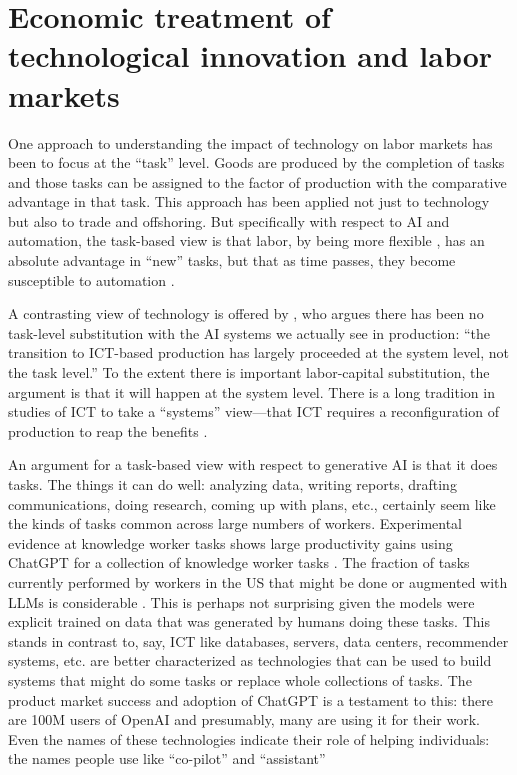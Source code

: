 \documentclass{article}
\begin{document}
\section{Economic treatment of technological innovation and labor markets}
One approach to understanding the impact of technology on labor markets has been to focus at the ``task'' level.
Goods are produced by the completion of tasks and those tasks can be assigned to the factor of production with the comparative advantage in that task.
This approach has been applied not just to technology but also to trade and offshoring.
But specifically with respect to AI and automation, the task-based view is that labor, by being more flexible \citep{acemoglu2011skills}, has an absolute advantage in ``new'' tasks, but that as time passes, they become susceptible to automation \citep{acemoglu2018}.

A contrasting view of technology is offered by \cite{bresnahan2020artificial}, who argues there has been no task-level substitution with the AI systems we actually see in production: ``the transition to ICT-based production has largely proceeded at the system level, not the task level.''
To the extent there is important labor-capital substitution, the argument is that it will happen at the system level.
There is a long tradition in studies of ICT to take a ``systems'' view---that ICT requires a reconfiguration of production to reap the benefits \citep{bresnahan2002information}. %

An argument for a task-based view with respect to generative AI is that it does tasks.
The things it can do well: analyzing data, writing reports, drafting communications, doing research, coming up with plans, etc., certainly seem like the kinds of tasks common across large numbers of workers.
Experimental evidence at knowledge worker tasks shows large productivity gains using ChatGPT for a collection of knowledge worker tasks \citep{noy2023experimental}.
The fraction of tasks currently performed by workers in the US that might be done or augmented with LLMs is considerable \citep{eloundou2023gpts}.
This is perhaps not surprising given the models were explicit trained on data that was generated by humans doing these tasks.
This stands in contrast to, say, ICT like databases, servers, data centers, recommender systems, etc. are better characterized as technologies that can be used to build systems that might do some tasks or replace whole collections of tasks.  
The product market success and adoption of ChatGPT is a testament to this: there are 100M users of OpenAI and presumably, many are using it for their work.
Even the names of these technologies indicate their role of helping individuals: the names people use like ``co-pilot'' and ``assistant'' 
\end{document}
